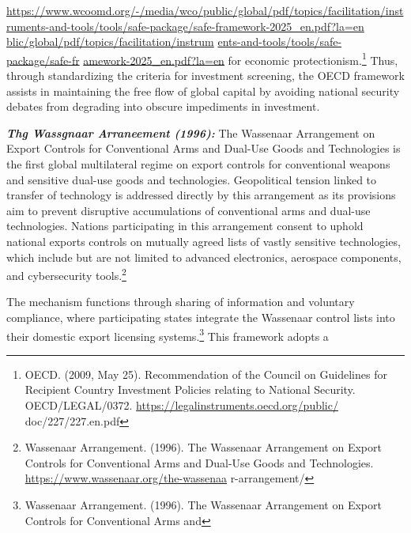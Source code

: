 \url{https://www.wcoomd.org/-/media/wco/public/global/pdf/topics/facilitation/instruments-and-tools/tools/safe-package/safe-framework-2025_en.pdf?la=en} \href{https://www.wcoomd.org/-/media/wco/public/global/pdf/topics/facilitation/instruments-and-tools/tools/safe-package/safe-framework-2025_en.pdf?la=en}{blic/global/pdf/topics/facilitation/instrum} \href{https://www.wcoomd.org/-/media/wco/public/global/pdf/topics/facilitation/instruments-and-tools/tools/safe-package/safe-framework-2025_en.pdf?la=en}{ents-and-tools/tools/safe-package/safe-fr} \href{https://www.wcoomd.org/-/media/wco/public/global/pdf/topics/facilitation/instruments-and-tools/tools/safe-package/safe-framework-2025_en.pdf?la=en}{amework-2025\_en.pdf?la=en} for economic protectionism.\footnote{OECD. (2009, May 25). Recommendation of the Council on Guidelines for Recipient Country Investment Policies relating to National Security. OECD/LEGAL/0372. \url{https://legalinstruments.oecd.org/public/} doc/227/227.en.pdf} Thus, through standardizing the criteria for investment screening, the OECD framework assists in maintaining the free flow of global capital by avoiding national security debates from degrading into obscure impediments in investment.

\emph{\textbf{Thg Wassgnaar Arraneement (1996):}} The Wassenaar Arrangement on Export Controls for Conventional Arms and Dual-Use Goods and Technologies is the first global multilateral regime on export controls for conventional weapons and sensitive dual-use goods and technologies. Geopolitical tension linked to transfer of technology is addressed directly by this arrangement as its provisions aim to prevent disruptive accumulations of conventional arms and dual-use technologies. Nations participating in this arrangement consent to uphold national exports controls on mutually agreed lists of vastly sensitive technologies, which include but are not limited to advanced electronics, aerospace components, and cybersecurity tools.\footnote{Wassenaar Arrangement. (1996). The Wassenaar Arrangement on Export Controls for Conventional Arms and Dual-Use Goods and Technologies. \url{https://www.wassenaar.org/the-wassenaa} r-arrangement/}

The mechanism functions through sharing of information and voluntary compliance, where participating states integrate the Wassenaar control lists into their domestic export licensing systems.\footnote{Wassenaar Arrangement. (1996). The Wassenaar Arrangement on Export Controls for Conventional Arms and}  This  framework  adopts a

